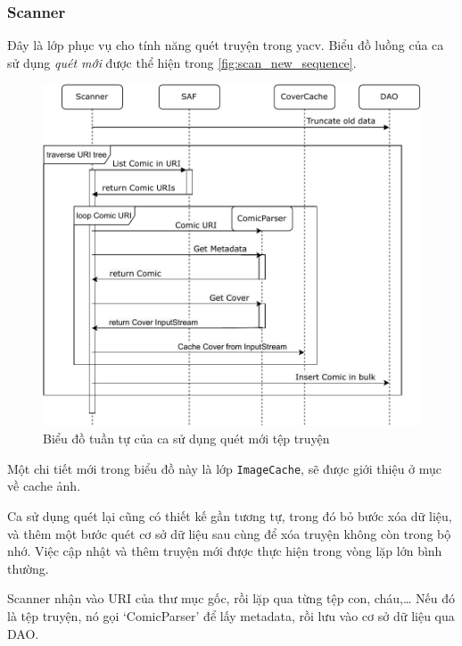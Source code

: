 \documentclass[../../../../thesis]{subfiles}
\begin{document}

\subsubsection{Scanner}

Đây là lớp phục vụ cho tính năng quét truyện trong yacv. Biểu đồ luồng của ca sử
dụng \emph{quét mới} được thể hiện trong \autoref{fig:scan_new_sequence}.

\begin{figure}[H]
    \centering
    \includegraphics[scale=0.8]{../images/scan_new_sequence.pdf}
    \caption{Biểu đồ tuần tự của ca sử dụng quét mới tệp truyện}
    \label{fig:scan_new_sequence}
\end{figure}

Một chi tiết mới trong biểu đồ này là lớp \texttt{ImageCache}, sẽ được giới
thiệu ở mục về cache ảnh.

Ca sử dụng quét lại cũng có thiết kế gần tương tự, trong đó bỏ bước xóa dữ liệu,
và thêm một bước quét cơ sở dữ liệu sau cùng để xóa truyện không còn trong bộ
nhớ. Việc cập nhật và thêm truyện mới được thực hiện trong vòng lặp lớn bình
thường.

Scanner nhận vào URI của thư mục gốc, rồi lặp qua từng tệp con, cháu,\ldots{}
Nếu đó là tệp truyện, nó gọi `ComicParser' để lấy metadata, rồi lưu vào cơ sở dữ
liệu qua DAO.
\end{document}
